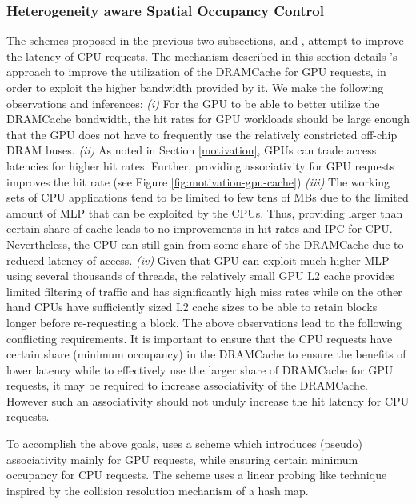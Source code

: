 \subsubsection{\hspace{-0.6em}Heterogeneity aware Spatial Occupancy Control} \label{mechanism-chaining}
The schemes proposed in the previous two subsections, \prioname and \bypassname, attempt to improve the latency of CPU requests. The mechanism described in this section details \cachename's approach to improve the utilization of the DRAMCache for GPU requests, in order to exploit the higher bandwidth provided by it. We make the following observations and inferences: \textit{(i)} For the GPU to be able to better utilize the DRAMCache bandwidth, the hit rates for GPU workloads should be large enough that the GPU does not have to frequently use the relatively constricted off-chip DRAM buses. \textit{(ii)} As noted in Section \ref{motivation}, GPUs can trade access latencies for higher hit rates. Further, providing associativity for GPU requests improves the hit rate (see Figure \ref{fig:motivation-gpu-cache}) \textit{(iii)} The working sets of CPU applications tend to be limited to few tens of MBs due to the limited amount of MLP that can be exploited by the CPUs. Thus, providing larger than certain share of cache leads to no improvements in hit rates and IPC for CPU. Nevertheless, the CPU can still gain from some share of the DRAMCache due to reduced latency of access. \textit{(iv)} Given that GPU can exploit much higher MLP using several thousands of threads, the relatively small GPU L2 cache provides limited filtering of traffic and has significantly high miss rates while on the other hand CPUs have sufficiently sized L2 cache sizes to be able to retain blocks longer before re-requesting a block.
The above observations lead to the following conflicting requirements. It is important to ensure that the CPU requests have certain share (minimum occupancy) in the DRAMCache to ensure the benefits of lower latency while to effectively use the larger share of DRAMCache for GPU requests, it may be required to increase  associativity of the DRAMCache. However such an associativity should not unduly increase the hit latency for CPU requests. 
\par To accomplish the above goals, \cachename uses a \chaining scheme which introduces (pseudo) associativity mainly for GPU requests, while ensuring certain minimum occupancy for CPU requests. The \chaining scheme uses a linear probing like technique inspired by the collision resolution mechanism of a hash map. 
